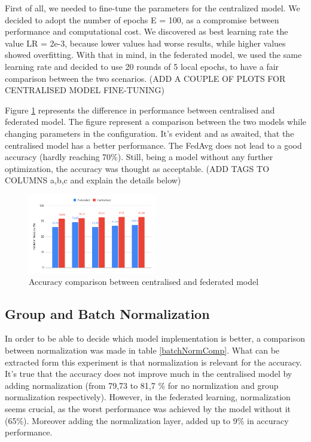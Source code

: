 \documentclass[twocolumn]{article}
\begin{document}
First of all, we needed to fine-tune the parameters for the centralized model. We decided to adopt the number of epochs E = 100, as a compromise between performance and computational cost. We discovered as best learning rate the value LR = 2e-3, because lower values had worse results, while higher values showed overfitting. With that in mind, in the federated model, we used the same learning rate and decided to use 20 rounds of 5 local epochs, to have a fair comparison between the two scenarios.
(ADD A COUPLE OF PLOTS FOR CENTRALISED MODEL FINE-TUNING)

Figure \ref{AccCompFedCent} represents the difference in performance between centralised and federated model. The figure represent a comparison between the two models while changing parameters in the configuration. It's evident and as awaited, that the centralised model has a better performance. The FedAvg does not lead to a good accuracy (hardly reaching 70\%). Still, being a model without any further optimization, the accuracy was thought as acceptable. (ADD TAGS TO COLUMNS a,b,c and explain the details below)


\begin{figure}
    \centering
    \includegraphics[width=0.5\textwidth,height=.3\textheight]{FedAccuracyComp.png}
    \caption{Accuracy comparison between centralised and federated model}
     \label{AccCompFedCent} 
\end{figure}
\subsection{Group and Batch Normalization}
In order to be able to decide which model implementation is better, a comparison between normalization was made in table \ref{batchNormComp}. What can be extracted form this experiment is that normalization is relevant for the accuracy. It's true that the accuracy does not improve much in the centralised model by adding normalization (from 79,73 to 81,7 \% for no normlization and group normalization respectively). However, in the federated learning, normalization seems crucial, as the worst performance was achieved by the model without it (65\%). Moreover adding the normalization layer, added up to 9\% in accuracy performance. 
\end{document}
